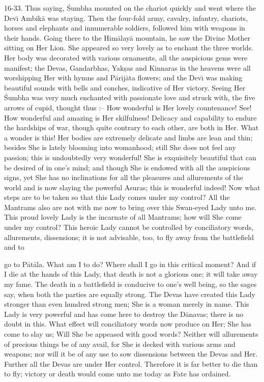 16-33. Thus saying, \'Sumbha mounted on the chariot quickly and went where the Dev\={\i} Ambik\=a was staying. Then the four-fold army, cavalry, infantry, chariots, horses and elephants and innumerable soldiers, followed him with weapons in their hands. Going there to the Him\=alay\=a mountain, he saw the Divine Mother sitting on Her Lion. She appeared so very lovely as to enchant the three worlds. Her body was decorated with various ornaments, all the auspicious gems were manifest; the Devas, Gandarbhas, Yak\d{s}as and Kinnaras in the heavens were all worshipping Her with hymns and P\=arij\=ata flowers; and the Dev\={\i} was making beautiful sounds with bells and conches, indicative of Her victory. Seeing Her \'Sumbha was very much enchanted with passionate love and struck with, the five arrows of cupid, thought thus :-- How wonderful is Her lovely countenance! See! How wonderful and amazing is Her skilfulness! Delicacy and capability to endure the hardships of war, though quite contrary to each other, are both in Her. What a wonder is this! Her bodies are extremely delicate and limbs are lean and thin; besides She is lately blooming into womanhood; still She does not feel any passion; this is undoubtedly very wonderful! She is exquisitely beautiful that can be desired of in one's mind; and though She is endowed with all the auspicious signs, yet She has no inclinations for all the pleasures and allurements of the world and is now slaying the powerful Asuras; this is wonderful indeed! Now what steps are to be taken so that this Lady comes under my control? All the Mantrams also are not with me now to bring over this Swan-eyed Lady unto me. This proud lovely Lady is the incarnate of all Mantrams; how will She come under my control? This heroic Lady cannot be controlled by conciliatory words, allurements, dissensions; it is not advisable, too, to fly away from the battlefield and to

go to P\=at\=ala. What am I to do? Where shall I go in this critical moment? And if I die at the hands of this Lady, that death is not a glorious one; it will take away my fame. The death in a battlefield is conducive to one's well being, so the sages say, when both the parties are equally strong. The Devas have created this Lady stronger than even hundred strong men; She is a woman merely in name. This Lady is very powerful and has come here to destroy the D\=anavas; there is no doubt in this. What effect will conciliatory words now produce on Her; She has come to slay us; Will She be appeased with good words? Neither will allurements of precious things be of any avail, for She is decked with various arms and weapons; nor will it be of any use to sow dissensions between the Devas and Her. Further all the Devas are under Her control. Therefore it is far better to die than to fly; victory or death would come unto me today as Fate has ordained.

